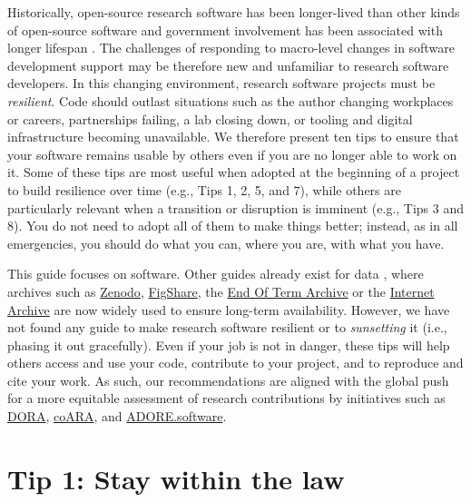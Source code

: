 \documentclass[10pt,letterpaper]{article}
\begin{document}
Historically, open-source research software has been longer-lived than other kinds of open-source software 
and government involvement has been associated with longer lifespan \cite{thakur2025}. 
The challenges of responding to macro-level changes in software development support may be therefore new and unfamiliar to research software developers.
In this changing environment,
research software projects must be \emph{resilient}.
Code should outlast situations such as the author changing workplaces or careers,
partnerships failing,
a lab closing down,
or tooling and digital infrastructure becoming unavailable.
We therefore present ten tips to ensure that your software remains usable by others
even if you are no longer able to work on it.
Some of these tips are most useful when adopted at the beginning of a project
to build resilience over time (e.g., Tips 1, 2, 5, and 7),
while others are particularly relevant when a transition or disruption is imminent
(e.g., Tips 3 and 8).
You do not need to adopt all of them to make things better;
instead,
as in all emergencies,
you should do what you can,
where you are,
with what you have.

This guide focuses on software.
Other guides already exist for data \cite{Perkel2023},
where archives such as \href{https://zenodo.org/}{Zenodo},
\href{https://figshare.com/}{FigShare},
the \href{https://eotarchive.org/}{End Of Term Archive}
or the \href{http://archive.org/}{Internet Archive}
are now widely used to ensure long-term availability.
However,
we have not found any guide to make research software resilient
or to \emph{sunsetting} it (i.e., phasing it out gracefully).
Even if your job is not in danger,
these tips will help others access and use your code,
contribute to your project,
and to reproduce and cite your work.
As such,
our recommendations
are aligned with the global push for a more equitable assessment of research contributions
by initiatives such as \href{https://sfdora.org/}{DORA},
\href{https://coara.eu/}{coARA},
and \href{https://adore.software/}{ADORE.software}.

\section*{Tip 1: Stay within the law}
\end{document}
